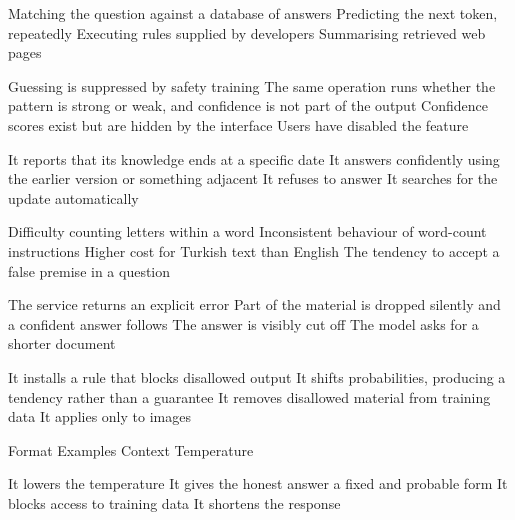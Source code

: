 \documentclass[11pt,a4paper]{article}
\begin{document}

\begin{questions}

  {Matching the question against a database of answers}
  {Predicting the next token, repeatedly}
  {Executing rules supplied by developers}
  {Summarising retrieved web pages}

  {Guessing is suppressed by safety training}
  {The same operation runs whether the pattern is strong or weak, and confidence is not part of the output}
  {Confidence scores exist but are hidden by the interface}
  {Users have disabled the feature}

  {It reports that its knowledge ends at a specific date}
  {It answers confidently using the earlier version or something adjacent}
  {It refuses to answer}
  {It searches for the update automatically}

  {Difficulty counting letters within a word}
  {Inconsistent behaviour of word-count instructions}
  {Higher cost for Turkish text than English}
  {The tendency to accept a false premise in a question}

  {The service returns an explicit error}
  {Part of the material is dropped silently and a confident answer follows}
  {The answer is visibly cut off}
  {The model asks for a shorter document}

  {It installs a rule that blocks disallowed output}
  {It shifts probabilities, producing a tendency rather than a guarantee}
  {It removes disallowed material from training data}
  {It applies only to images}

  {Format}
  {Examples}
  {Context}
  {Temperature}

  {It lowers the temperature}
  {It gives the honest answer a fixed and probable form}
  {It blocks access to training data}
  {It shortens the response}


\end{questions}
\end{document}
